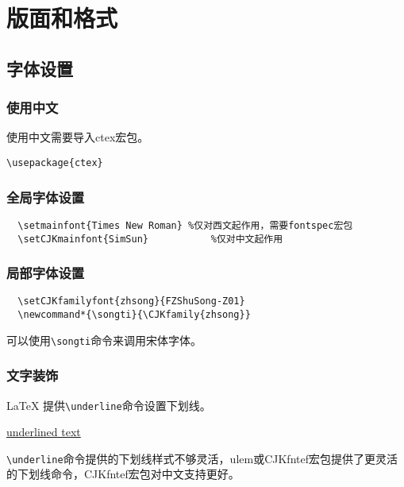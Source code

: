 \chapter{版面和格式}\label{chap:format}



\section{字体设置}\label{sec:font}
\subsection{使用中文}\label{subsec:chinese}
使用中文需要导入ctex宏包。
\begin{lstlisting}
\usepackage{ctex}
\end{lstlisting}

\subsection{全局字体设置}\label{subsec:global}

\begin{lstlisting}
  \setmainfont{Times New Roman}	%仅对西文起作用，需要fontspec宏包
  \setCJKmainfont{SimSun}			%仅对中文起作用
\end{lstlisting}

\subsection{局部字体设置}\label{subsec:local}

\begin{lstlisting}
  \setCJKfamilyfont{zhsong}{FZShuSong-Z01}
  \newcommand*{\songti}{\CJKfamily{zhsong}}
\end{lstlisting}

可以使用\lstinline{\songti}命令来调用宋体字体。

\subsection{文字装饰}\label{subsec:decor}

\LaTeX{} 提供\lstinline{\underline}命令设置下划线。

\begin{codeshow}
  \underline{underlined text}
\end{codeshow}

\lstinline{\underline}命令提供的下划线样式不够灵活，ulem或CJKfntef宏包提供了更灵活的下划线命令，CJKfntef宏包对中文支持更好。

